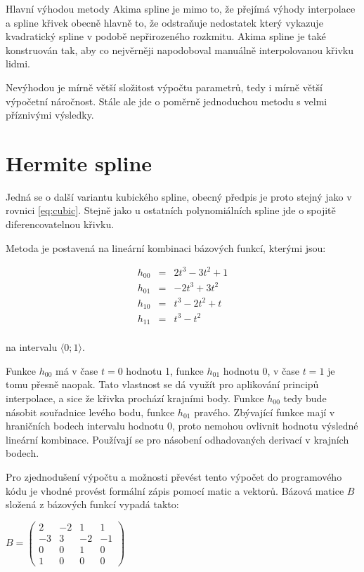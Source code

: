 \documentclass[]{thesiskiv}
\begin{document}
Hlavní výhodou metody Akima spline je mimo to, že přejímá výhody interpolace a spline křivek obecně hlavně to, že odstraňuje nedostatek který vykazuje kvadratický spline v podobě nepřirozeného rozkmitu. Akima spline je také konstruován tak, aby co nejvěrněji napodoboval manuálně interpolovanou křivku lidmi.

Nevýhodou je mírně větší složitost výpočtu parametrů, tedy i mírně větší výpočetní náročnost. Stále ale jde o poměrně jednoduchou metodu s velmi příznivými výsledky.

\section{Hermite spline}

Jedná se o další variantu kubického spline, obecný předpis je proto stejný jako v rovnici \ref{eq:cubic}. Stejně jako u ostatních polynomiálních spline jde o spojitě diferencovatelnou křivku\cite{hermite}.

Metoda je postavená na lineární kombinaci bázových funkcí, kterými jsou:

\begin{equation}
\begin{array}{rcl}
 h_{00} & = & 2t^3 - 3t^2 + 1 \\
 h_{01} & = & -2t^3 + 3t^2 \\
 h_{10} & = & t^3 - 2t^2 + t \\
 h_{11} & = & t^3 - t^2 \\
\end{array}
\end{equation}

na intervalu $\langle0;1\rangle$.

Funkce $h_{00}$ má v čase $t = 0$ hodnotu 1, funkce $h_{01}$ hodnotu 0, v čase $t = 1$ je tomu přesně naopak. Tato vlastnost se dá využít pro aplikování principů interpolace, a sice že křivka prochází krajními body. Funkce $h_{00}$ tedy bude násobit souřadnice levého bodu, funkce $h_{01}$ pravého. Zbývající funkce mají v hraničních bodech intervalu hodnotu 0, proto nemohou ovlivnit hodnotu výsledné lineární kombinace. Používají se pro násobení odhadovaných derivací v krajních bodech.

Pro zjednodušení výpočtu a možnosti převést tento výpočet do programového kódu je vhodné provést formální zápis pomocí matic a vektorů. Bázová matice $B$ složená z bázových funkcí vypadá takto:

\begin{center}
\begin{math}
B = 
 \begin{pmatrix}
  2 & -2 & 1 & 1 \\
  -3 & 3 & -2 & -1 \\
  0 & 0 & 1 & 0 \\
  1 & 0 & 0 & 0
 \end{pmatrix}
\end{math}
\end{center}
\end{document}
